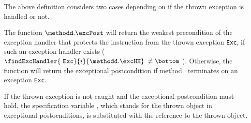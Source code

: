 The above definition considers two cases depending on if  the thrown exception   is handled or not.

The function $\methodd.\excPost$ will return the weakest precondition of the exception handler that protects the instruction from the thrown exception \texttt{Exc},
if such an exception handler exists ( $  \findExcHandler{\mbox{ \rm \texttt{Exc}} }{i}{\methodd.\excHH} $ $ \neq \bottom $ ). 
Otherwise, the function will return the exceptional postcondition if method \methodd \ terminates on
an exception  \texttt{Exc}.
  
 If the thrown exception is not caught  and the exceptional postcondition must hold, the specification variable \EXC, which stands for the thrown object in exceptional 
postocnditions, is substituted with the reference to the thrown object.


